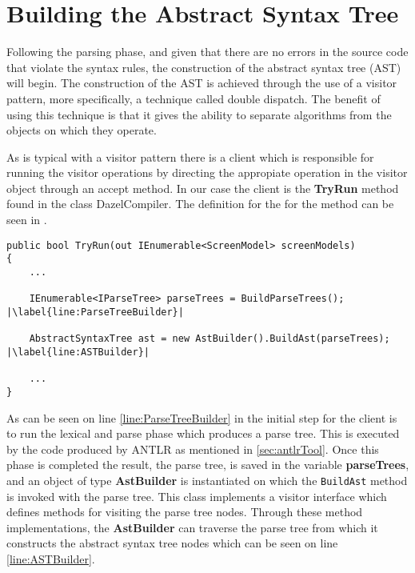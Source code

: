 \section{Building the Abstract Syntax Tree} \label{sec:buildASTSection}

Following the parsing phase, and given that there are no errors in the source code that violate the syntax rules, the construction of the abstract syntax tree (AST) will begin. The construction of the AST is achieved through the use of a visitor pattern, more specifically, a technique called double dispatch. The benefit of using this technique is that it gives the ability to separate algorithms from the objects on which they operate\cite{VisitorGuru}. 

As is typical with a visitor pattern there is a client which is responsible for running the visitor operations by directing the appropiate operation in the visitor object through an accept method. In our case the client is the \textbf{TryRun} method found in the class DazelCompiler. The definition for the for the method can be seen in .

\begin{lstlisting}[language=CSharp, caption={The Run method that serves as a client inside the DazelCompiler class}, label={lst:RunMethod},escapechar=|]
public bool TryRun(out IEnumerable<ScreenModel> screenModels)
{
    ...

    IEnumerable<IParseTree> parseTrees = BuildParseTrees(); |\label{line:ParseTreeBuilder}|

    AbstractSyntaxTree ast = new AstBuilder().BuildAst(parseTrees); |\label{line:ASTBuilder}|

    ...
}
\end{lstlisting}

As can be seen on line \ref{line:ParseTreeBuilder} in  the initial step for the client is to run the lexical and parse phase which produces a parse tree. This is executed by the code produced by ANTLR as mentioned in \ref{sec:antlrTool}. Once this phase is completed the result, the parse tree, is saved in the variable \textbf{parseTrees}, and an object of type \textbf{AstBuilder} is instantiated on which the \texttt{BuildAst} method is invoked with the parse tree. This class implements a visitor interface which defines methods for visiting the parse tree nodes. Through these method implementations, the \textbf{AstBuilder} can traverse the parse tree from which it constructs the abstract syntax tree nodes which can be seen on line \ref{line:ASTBuilder}. 

